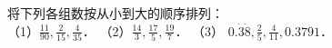 
将下列各组数按从小到大的顺序排列：\\
（1）$\frac{11}{90}, \frac{2}{15}, \frac{4}{35}$．\hspace{8em}   （2）$\frac{14}{3}, \frac{17}{5}, \frac{19}{7}$．\hspace{8em}     （3） $0.\dot{3} \dot{8}, \frac{2}{5}, \frac{4}{11}, 0.3791$．


